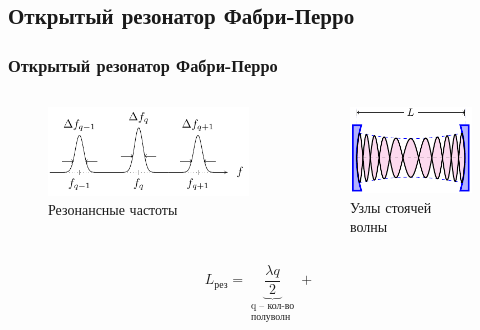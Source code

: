 \subsection{Открытый резонатор Фабри-Перро}
\begin{frame}[c]%
	\frametitle{Открытый резонатор Фабри-Перро}
	\vspace{-2em}
	\begin{columns}[b]
	\begin{column}{0.49\textwidth}%
	\begin{figure}[H]
		\centering
		\includegraphics[scale=1]{ris/fq}
		\caption{Резонансные частоты}
		\label{fig:chem}
	\end{figure}
	\end{column}
	\begin{column}{0.49\textwidth}%
	\begin{figure}[H]
		\centering
		\includegraphics[scale=1]{ris/fabri}
		\caption{Узлы стоячей волны
		 }
		\label{fig:chem}
	\end{figure}	
	\end{column}
	\end{columns}
	\vspace{-0.5em}
	\begin{equation*}
		L_\text{рез}=
			 \underbrace{\frac{\lambda q}{2}}_{\substack{\text{q -- кол-во}\\\text{полуволн}}}+

\end{equation*}
\end{frame}
